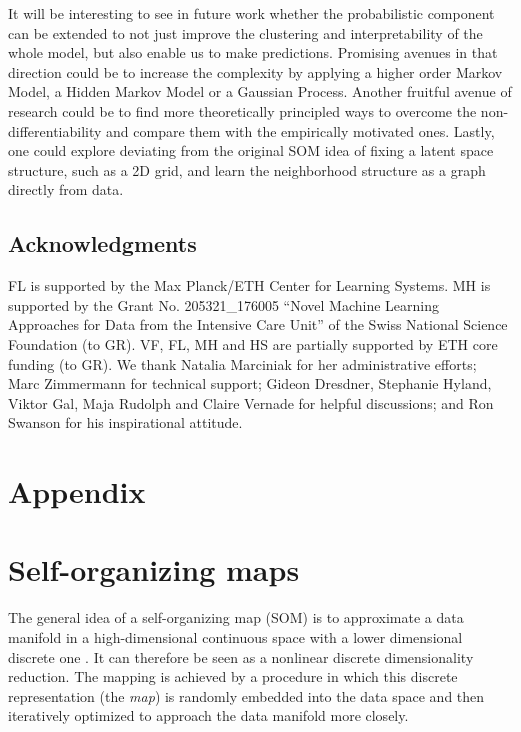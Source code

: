 \documentclass{article}
\newcommand{\beginsupplement}{\setcounter{table}{0}
        \renewcommand{\thetable}{S\arabic{table}}\setcounter{figure}{0}
        \renewcommand{\thefigure}{S\arabic{figure}}}
\begin{document}
It will be interesting to see in future work whether the probabilistic component can be extended to not just improve the clustering and interpretability of the whole model, but also enable us to make predictions.
Promising avenues in that direction could be to increase the complexity by applying a higher order Markov Model, a Hidden Markov Model or a Gaussian Process.
Another fruitful avenue of research could be to find more theoretically principled ways to overcome the non-differentiability and compare them with the empirically motivated ones.
Lastly, one could explore deviating from the original SOM idea of fixing a latent space structure, such as a 2D grid, and learn the neighborhood structure as a graph directly from data.


\subsection*{Acknowledgments}

FL is supported by the Max Planck/ETH Center for Learning Systems.
MH is supported by the Grant No. 205321\_176005 ``Novel Machine Learning Approaches for Data from the Intensive Care
Unit'' of the Swiss National Science Foundation (to GR).
VF, FL, MH and HS are partially supported by ETH core funding (to GR).
We thank Natalia Marciniak for her administrative efforts; Marc Zimmermann for technical support; Gideon Dresdner, Stephanie Hyland, Viktor Gal, Maja Rudolph and Claire Vernade for helpful discussions; and Ron Swanson for his inspirational attitude. 


\beginsupplement

\newpage

\appendix

\section*{Appendix}

\section{Self-organizing maps}\label{sec:SOMs}

The general idea of a self-organizing map (SOM) is to approximate a data manifold in a high-dimensional continuous space with a lower dimensional discrete one \citep{Kohonen1998}.
It can therefore be seen as a nonlinear discrete dimensionality reduction.
The mapping is achieved by a procedure in which this discrete representation (the \emph{map}) is randomly embedded into the data space and then iteratively optimized to approach the data manifold more closely.
\end{document}
